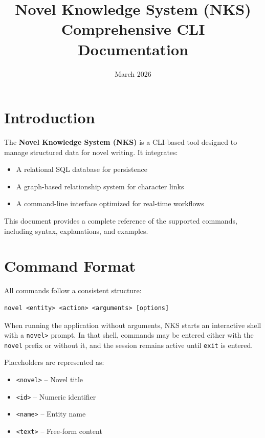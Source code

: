 \documentclass[11pt]{article}
\title{\textbf{Novel Knowledge System (NKS)}\\Comprehensive CLI Documentation}
\author{}
\date{March 2026}
\begin{document}
\maketitle

\section{Introduction}

The \textbf{Novel Knowledge System (NKS)} is a CLI-based tool designed to manage structured data for novel writing. It integrates:

\begin{itemize}
    \item A relational SQL database for persistence
    \item A graph-based relationship system for character links
    \item A command-line interface optimized for real-time workflows
\end{itemize}

This document provides a complete reference of the supported commands, including syntax, explanations, and examples.

\section{Command Format}

All commands follow a consistent structure:

\begin{verbatim}
novel <entity> <action> <arguments> [options]
\end{verbatim}

When running the application without arguments, NKS starts an interactive shell with a \texttt{novel>} prompt. In that shell, commands may be entered either with the \texttt{novel} prefix or without it, and the session remains active until \texttt{exit} is entered.

Placeholders are represented as:

\begin{itemize}
    \item \texttt{<novel>} -- Novel title
    \item \texttt{<id>} -- Numeric identifier
    \item \texttt{<name>} -- Entity name
    \item \texttt{<text>} -- Free-form content
\end{itemize}
\end{document}
